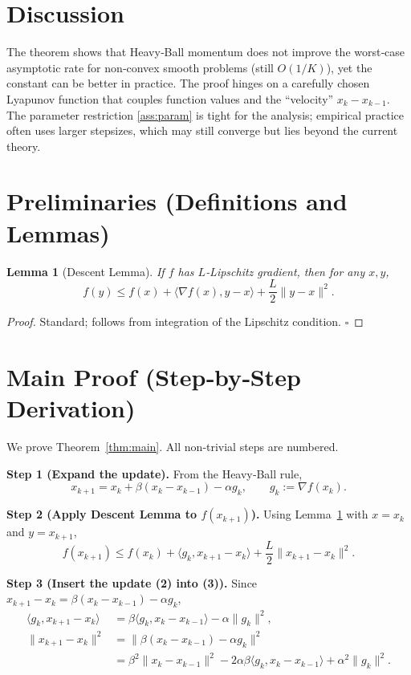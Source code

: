 \documentclass{article}
\newtheorem{lemma}{Lemma}
\newcommand{\grad}{\nabla}
\begin{document}
\section*{Discussion}
The theorem shows that Heavy‑Ball momentum does not improve the worst‑case asymptotic rate for non‑convex smooth problems (still $O(1/K)$), yet the constant can be better in practice. The proof hinges on a carefully chosen Lyapunov function that couples function values and the ``velocity'' $x_{k}-x_{k-1}$. The parameter restriction \eqref{ass:param} is tight for the analysis; empirical practice often uses larger stepsizes, which may still converge but lies beyond the current theory.

\newpage
\section*{Preliminaries (Definitions and Lemmas)}
\begin{lemma}[Descent Lemma]\label{lem:descent}
If $f$ has $L$‑Lipschitz gradient, then for any $x,y$,
\[
f(y)\le f(x)+\langle\grad f(x),y-x\rangle+\frac{L}{2}\|y-x\|^{2}.
\]
\end{lemma}
\begin{proof}
Standard; follows from integration of the Lipschitz condition. \hfill $\square$
\end{proof}

\section*{Main Proof (Step‑by‑Step Derivation)}
We prove Theorem~\ref{thm:main}. All non‑trivial steps are numbered.

\medskip
\noindent\textbf{Step 1 (Expand the update).}  
From the Heavy‑Ball rule,
\[
x_{k+1}=x_{k}+\beta (x_{k}-x_{k-1})-\alpha g_{k},
\qquad g_{k}:=\grad f(x_{k}).
\tag{2}
\]

\noindent\textbf{Step 2 (Apply Descent Lemma to $f(x_{k+1})$).}  
Using Lemma~\ref{lem:descent} with $x=x_{k}$ and $y=x_{k+1}$,
\[
f(x_{k+1})\le f(x_{k})+\langle g_{k},x_{k+1}-x_{k}\rangle
+\frac{L}{2}\|x_{k+1}-x_{k}\|^{2}.
\tag{3}
\]

\noindent\textbf{Step 3 (Insert the update (2) into (3)).}  
Since $x_{k+1}-x_{k}= \beta (x_{k}-x_{k-1})-\alpha g_{k}$,
\[
\begin{aligned}
\langle g_{k},x_{k+1}-x_{k}\rangle
&=\beta\langle g_{k},x_{k}-x_{k-1}\rangle-\alpha\|g_{k}\|^{2},\\
\|x_{k+1}-x_{k}\|^{2}
&=\|\beta (x_{k}-x_{k-1})-\alpha g_{k}\|^{2}\\
&=\beta^{2}\|x_{k}-x_{k-1}\|^{2}
-2\alpha\beta\langle g_{k},x_{k}-x_{k-1}\rangle
+\alpha^{2}\|g_{k}\|^{2}.
\end{aligned}
\tag{4}
\]
\end{document}
